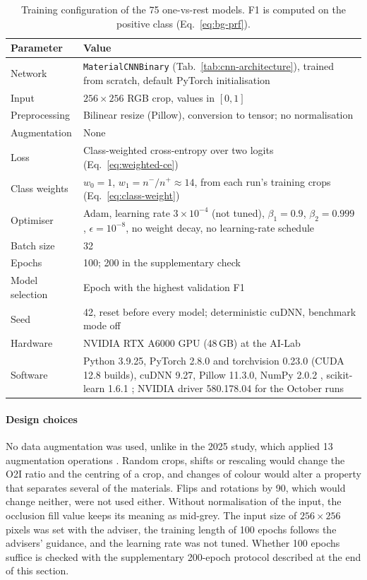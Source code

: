 \begin{table}[htbp]
\centering
\caption[Training configuration]{Training configuration of the 75 one-vs-rest models. F1
is computed on the positive class (Eq.~\eqref{eq:bg-prf}).}
\label{tab:training-config}
\begin{tabular}{lp{9cm}}
\toprule
Parameter & Value \\
\midrule
Network & \texttt{MaterialCNNBinary} (Tab.~\ref{tab:cnn-architecture}), trained from
scratch, default PyTorch initialisation \\
Input & $256 \times 256$ RGB crop, values in $[0,1]$ \\
Preprocessing & Bilinear resize (Pillow), conversion to tensor; no normalisation \\
Augmentation & None \\
Loss & Class-weighted cross-entropy over two logits (Eq.~\eqref{eq:weighted-ce}) \\
Class weights & $w_0 = 1$, $w_1 = n^-/n^+ \approx 14$, from each run's training crops
(Eq.~\eqref{eq:class-weight}) \\
Optimiser & Adam, learning rate $3 \times 10^{-4}$ (not tuned), $\beta_1 = 0.9$,
$\beta_2 = 0.999$, $\epsilon = 10^{-8}$, no weight decay, no learning-rate schedule \\
Batch size & 32 \\
Epochs & 100; 200 in the supplementary check \\
Model selection & Epoch with the highest validation F1 \\
Seed & 42, reset before every model; deterministic cuDNN, benchmark mode off \\
Hardware & NVIDIA RTX A6000 GPU (48\,GB) at the AI-Lab \\
Software & Python 3.9.25, PyTorch 2.8.0 \citep{paszke2019pytorch} and torchvision 0.23.0 (CUDA 12.8 builds),
cuDNN 9.27, Pillow 11.3.0, NumPy 2.0.2 \citep{harris2020numpy}, scikit-learn 1.6.1 \citep{pedregosa2011scikit}; NVIDIA driver 580.178.04
for the October runs \\
\bottomrule
\end{tabular}
\end{table}

\paragraph{Design choices}
\label{sec:methodology-design}
No data augmentation was used, unlike in the 2025 study, which applied 13
augmentation operations \citep{schneidereitYOLOv8}. Random crops, shifts or rescaling
would change the O2I ratio and the centring of a crop, and changes of colour would
alter a property that separates several of the materials. Flips and rotations by
90\textdegree, which would change neither, were not used either. Without normalisation of the
input, the occlusion fill value keeps its meaning as mid-grey. The input size of
$256 \times 256$ pixels was set with the adviser, the training length of 100
epochs follows the advisers' guidance, and the learning rate was not tuned. Whether 100
epochs suffice is checked with the supplementary 200-epoch protocol described at the
end of this section.


